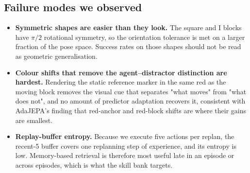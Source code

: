 \subsection{Failure modes we observed}

\begin{itemize}[leftmargin=1.2em,itemsep=2pt]
\item \textbf{Symmetric shapes are easier than they look.} The square and I blocks have
$\pi/2$ rotational symmetry, so the orientation tolerance is met on a larger fraction of the
pose space. Success rates on those shapes should not be read as geometric generalisation.
\item \textbf{Colour shifts that remove the agent--distractor distinction are hardest.}
Rendering the static reference marker in the same red as the moving block removes the visual
cue that separates "what moves" from "what does not", and no amount of predictor adaptation
recovers it, consistent with AdaJEPA's finding that red-anchor and red-block shifts are where
their gains are smallest.
\item \textbf{Replay-buffer entropy.} Because we execute five actions per replan, the recent-5
buffer covers one replanning step of experience, and its entropy is low. Memory-based
retrieval is therefore most useful late in an episode or across episodes, which is what the
skill bank targets.
\end{itemize}